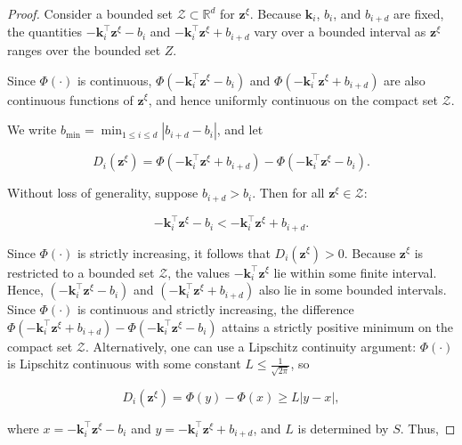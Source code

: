 \documentclass{article}
\theoremstyle{plain}
\theoremstyle{definition}
\begin{document}
\begin{proof}


Consider a bounded set $\mathcal{Z} \subset \mathbb{R}^d$ for $\mathbf{z}^{\xi}$. Because $\mathbf{k}_i$, $b_i$, and $b_{i+d}$ are fixed, the quantities $-\mathbf{k}_i^{\top} \mathbf{z}^{\xi}-b_i$ and $-\mathbf{k}_i^{\top} \mathbf{z}^{\xi}+b_{i+d}$ vary over a bounded interval as $\mathbf{z}^{\xi}$ ranges over the bounded set $Z$.

Since $\Phi(\cdot)$ is continuous, $\Phi\left(-\mathbf{k}_i^{\top} \mathbf{z}^{\xi}-b_i\right)$ and $\Phi\left(-\mathbf{k}_i^{\top} \mathbf{z}^{\xi}+b_{i+d}\right)$ are also continuous functions of $\mathbf{z}^{\xi}$, and hence uniformly continuous on the compact set $\mathcal{Z}$.

We write $b_{\min }=\min _{1 \leq i \leq d}\left|b_{i+d}-b_i\right|$, and let

\begin{equation}
D_i\left(\mathbf{z}^{\xi}\right)=\Phi\left(-\mathbf{k}_i^{\top} \mathbf{z}^{\xi}+b_{i+d}\right)-\Phi\left(-\mathbf{k}_i^{\top} \mathbf{z}^{\xi}-b_i\right).
\end{equation}

Without loss of generality, suppose $b_{i+d}>b_i$. Then for all $\mathbf{z}^{\xi} \in \mathcal{Z}$: 

\[
-\mathbf{k}_i^{\top} \mathbf{z}^{\xi}-b_i<-\mathbf{k}_i^{\top} \mathbf{z}^{\xi}+b_{i+d} .
\]


Since $\Phi(\cdot)$ is strictly increasing, it follows that $D_i\left(\mathbf{z}^{\xi}\right)>0$. 
Because $\mathbf{z}^{\xi}$ is restricted to a bounded set $\mathcal{Z}$, the values $-\mathbf{k}_i^{\top} \mathbf{z}^{\xi}$ lie within some finite interval. 
Hence, $\left(-\mathbf{k}_i^{\top} \mathbf{z}^{\xi}-b_i\right)$ and $\left(-\mathbf{k}_i^{\top} \mathbf{z}^{\xi}+b_{i+d}\right)$ also lie in some bounded intervals. 
Since $\Phi(\cdot)$ is continuous and strictly increasing, the difference $\Phi\left(-\mathbf{k}_i^{\top} \mathbf{z}^{\xi}+b_{i+d}\right)-\Phi\left(-\mathbf{k}_i^{\top} \mathbf{z}^{\xi}-b_i\right)$ attains a strictly positive minimum on the compact set $\mathcal{Z}$. Alternatively, one can use a Lipschitz continuity argument: $\Phi(\cdot)$ is Lipschitz continuous with some constant $L \leq \frac{1}{\sqrt{2 \pi}}$, so

\[
D_i\left(\mathbf{z}^{\xi}\right)=\Phi(y)-\Phi(x) \geq L|y-x|,
\]

where $x=-\mathbf{k}_i^{\top} \mathbf{z}^{\xi}-b_i$ and $y=-\mathbf{k}_i^{\top} \mathbf{z}^{\xi}+b_{i+d}$, and $L$ is determined by $S$. Thus,


\end{proof}
\end{document}
